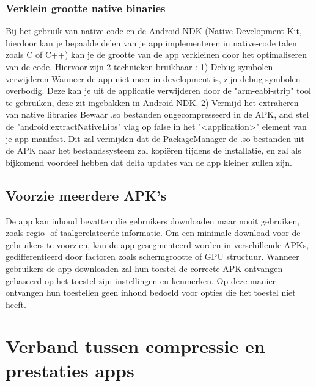 \subsubsection*{Verklein grootte native binaries}
\label{sec:reducesizenativebinaries}
Bij het gebruik van native code en de Android NDK (Native Development Kit, hierdoor kan je bepaalde delen van je app implementeren in native-code talen zoals C of C++) kan je de grootte van de app verkleinen door het optimaliseren van de code. Hiervoor zijn 2 technieken bruikbaar :
1) Debug symbolen verwijderen
Wanneer de app niet meer in development is, zijn debug symbolen overbodig. Deze kan je uit de applicatie verwijderen door de "arm-eabi-strip" tool te gebruiken, deze zit ingebakken in Android NDK.
2) Vermijd het extraheren van native libraries
Bewaar .so bestanden ongecompresseerd in de APK, and stel de "android:extractNativeLibs" vlag op false in het "<application>" element van je app manifest. Dit zal vermijden dat de PackageManager de .so bestanden uit de APK naar het bestandssysteem zal kopiëren tijdens de installatie, en zal als bijkomend voordeel hebben dat delta updates van de app kleiner zullen zijn. 
\subsection{Voorzie meerdere APK's}
\label{sec:multipleapks}
De app kan inhoud bevatten die gebruikers downloaden maar nooit gebruiken, zoals regio- of taalgerelateerde informatie. Om een minimale download voor de gebruikers te voorzien, kan de app gesegmenteerd worden in verschillende APKs, gedifferentieerd door factoren zoals schermgrootte of GPU structuur.
Wanneer gebruikers de app downloaden zal hun toestel de correcte APK ontvangen gebaseerd op het toestel zijn instellingen en kenmerken. Op deze manier ontvangen hun toestellen geen inhoud bedoeld voor opties die het toestel niet heeft.


\section{Verband tussen compressie en prestaties apps}
\label{sec:verbandcompressieprestaties}
